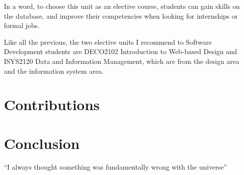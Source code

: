 \documentclass[12pt]{article}
\begin{document}
In a word, to choose this unit as an elective course, students can gain skills on the database, and improve their competencies when looking for internships or formal jobs.

Like all the previous, the two elective units I recommend to Software Development students are DECO2102 Introduction to Web-based Design and ISYS2120 Data and Information Management, which are from the design area and the information system area.


\newpage
\section{Contributions}

\newpage
\section{Conclusion}
``I always thought something was fundamentally wrong with the universe\cite{Burridge_2018a}''
{}

% 







\end{document}
